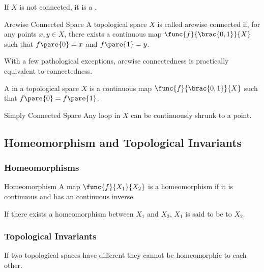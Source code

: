 \documentclass[hidelinks]{article}
\begin{document}
If $X$ is not connected, it is a .
\begin{termdef}{Arcwise Connected Space}
    A topological space $X$ is called arcwise connected if, for any points $x,y \in X$, there exists a continuous map $\func{f}{\brac{0,1}}{X}$ such that $f\pare{0} = x$ and $f\pare{1} = y$.
\end{termdef}
With a few pathological exceptions, arcwise connectedness is practically equivalent to connectedness.
\par
A  in a topological space $X$ is a continuous map $\func{f}{\brac{0,1}}{X}$ such that $f\pare{0} = f\pare{1}$.
\begin{termdef}{Simply Connected Space}
    Any loop in $X$ can be continuously shrunk to a point.
\end{termdef}



\subsection{Homeomorphism and Topological Invariants} %
\label{sub:homeomorphism_and_topological_invariants}

\subsubsection{Homeomorphisms} %
\label{ssub:homeomorphisms}

\begin{termdef}{Homeomorphism}
    A map $\func{f}{X_1}{X_2}$ is a homeomorphism if it is continuous and has an continuous inverse.
\end{termdef}
If there exists a homeomorphism between $X_1$ and $X_2$, $X_1$ is said to be  to $X_2$.


\subsubsection{Topological Invariants} %
\label{ssub:topological_invariants}

If two topological spaces have different  they cannot be homeomorphic to each other.

\end{document}
